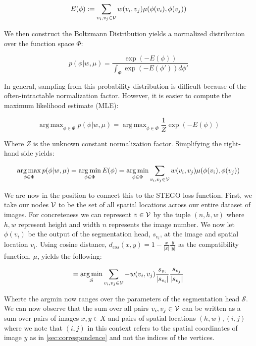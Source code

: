 \documentclass{article} \usepackage{iclr2022_conference,times}
\DeclareMathOperator*{\argmax}{arg\,max}
\DeclareMathOperator*{\argmin}{arg\,min}
\begin{document}
\begin{equation}
    E(\phi) := \sum_{v_i, v_j \in \mathcal{V}} w(v_i, v_j) \mu(\phi(v_i), \phi(v_j))
\end{equation}

We then construct the Boltzmann Distribution \citep{hinton2002training} yields a normalized distribution over the function space $\Phi$:

\begin{equation}
    p(\phi | w, \mu ) = \frac{\exp(-E(\phi))}{\int_\Phi \exp(-E(\phi')) d\phi'}
\end{equation}

In general, sampling from this probability distribution is difficult because of the often-intractable normalization factor. However, it is easier to compute the maximum likelihood estimate (MLE):

\begin{equation}
\argmax_{\phi \in \Phi} p(\phi | w, \mu ) = \argmax_{\phi \in \Phi} \frac{1}{Z} \exp(-E(\phi))
\end{equation}

Where $Z$ is the unknown constant normalization factor. Simplifying the right-hand side yields: 

\begin{equation}
\argmax_{\phi \in \Phi} p(\phi | w, \mu ) = \argmin_{\phi \in \Phi} E(\phi) = \argmin_{\phi \in \Phi} \sum_{v_i, v_j \in \V} w(v_i, v_j) \mu(\phi(v_i), \phi(v_j))
\end{equation}

We are now in the position to connect this to the STEGO loss function. First, we take our nodes $\mathcal{V}$ to be the set of all spatial locations across our entire dataset of images. For concreteness we can represent $v \in \mathcal{V}$ by the tuple $(n, h, w)$ where $h,w$ represent height and width $n$ represents the image number. We now let $\phi(v_i)$ be the output of the segmentation head, $s_{v_i}$, at the image and spatial location $v_i$. Using cosine distance, $d_{cos}(x,y) = 1- \frac{x}{|x|}\frac{y}{|y|}$  as the compatibility function, $\mu$, yields the following:

\begin{equation}
     = \argmin_{\mathcal{S}} \sum_{v_i, v_j \in \V} -w(v_i, v_j) \frac{s_{v_i}}{|s_{v_i}|}\frac{s_{v_j}}{|s_{v_j}|}
\end{equation}

Wherte the argmin now ranges over the parameters of the segmentation head $\mathcal{S}$. We can now observe that the sum over all pairs $v_{i},v_{j} \in \mathcal{V}$ can be written as a sum over pairs of images $x,y \in X$ and pairs of spatial locations $(h,w), (i,j)$ where we note that $(i,j)$ in this context refers to the spatial coordinates of image $y$ as in \ref{sec:correspondence} and not the indices of the vertices. 
\end{document}
